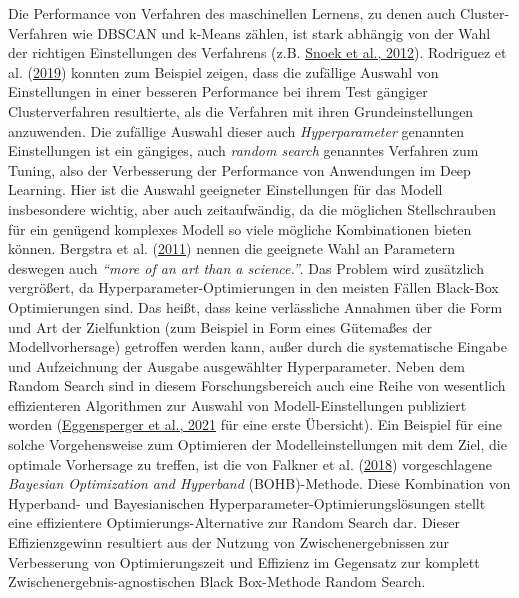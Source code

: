 \documentclass[
  12pt,
  openany]{book}
\begin{document}
Die Performance von Verfahren des maschinellen Lernens, zu denen auch Cluster-Verfahren wie DBSCAN und k-Means zählen, ist stark abhängig von der Wahl der richtigen Einstellungen des Verfahrens (z.B. \protect\hyperlink{ref-snoekPracticalBayesianOptimization2012}{Snoek et al., 2012}). Rodriguez et al. (\protect\hyperlink{ref-rodriguezClusteringAlgorithmsComparative2019a}{2019}) konnten zum Beispiel zeigen, dass die zufällige Auswahl von Einstellungen in einer besseren Performance bei ihrem Test gängiger Clusterverfahren resultierte, als die Verfahren mit ihren Grundeinstellungen anzuwenden.
Die zufällige Auswahl dieser auch \emph{Hyperparameter} genannten Einstellungen ist ein gängiges, auch \emph{random search} genanntes Verfahren zum Tuning, also der Verbesserung der Performance von Anwendungen im Deep Learning. Hier ist die Auswahl geeigneter Einstellungen für das Modell insbesondere wichtig, aber auch zeitaufwändig, da die möglichen Stellschrauben für ein genügend komplexes Modell so viele mögliche Kombinationen bieten können. Bergstra et al. (\protect\hyperlink{ref-bergstraAlgorithmsHyperParameterOptimization2011}{2011}) nennen die geeignete Wahl an Parametern deswegen auch \emph{``more of an art than a science.''}.
Das Problem wird zusätzlich vergrößert, da Hyperparameter-Optimierungen in den meisten Fällen Black-Box Optimierungen sind. Das heißt, dass keine verlässliche Annahmen über die Form und Art der Zielfunktion (zum Beispiel in Form eines Gütemaßes der Modellvorhersage) getroffen werden kann, außer durch die systematische Eingabe und Aufzeichnung der Ausgabe ausgewählter Hyperparameter. Neben dem Random Search sind in diesem Forschungsbereich auch eine Reihe von wesentlich effizienteren Algorithmen zur Auswahl von Modell-Einstellungen publiziert worden (\protect\hyperlink{ref-eggenspergerHPOBenchCollectionReproducible2021}{Eggensperger et al., 2021} für eine erste Übersicht). \newline
Ein Beispiel für eine solche Vorgehensweise zum Optimieren der Modelleinstellungen mit dem Ziel, die optimale Vorhersage zu treffen, ist die von Falkner et al. (\protect\hyperlink{ref-falknerBOHBRobustEfficient2018}{2018}) vorgeschlagene \emph{Bayesian Optimization and Hyperband} (BOHB)-Methode. Diese Kombination von Hyperband- und Bayesianischen Hyperparameter-Optimierungslösungen stellt eine effizientere Optimierungs-Alternative zur Random Search dar. Dieser Effizienzgewinn resultiert aus der Nutzung von Zwischenergebnissen zur Verbesserung von Optimierungszeit und Effizienz im Gegensatz zur komplett Zwischenergebnis-agnostischen Black Box-Methode Random Search. \newline
\end{document}
